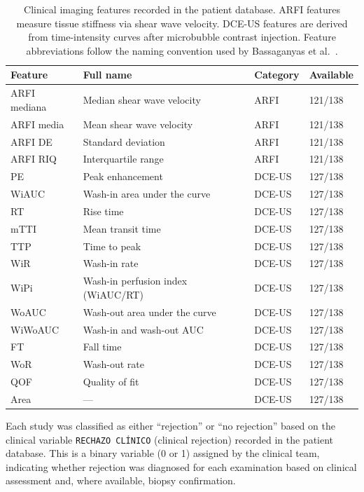 \begin{table}[ht]
\centering
\caption{Clinical imaging features recorded in the patient database. ARFI features measure tissue stiffness via shear wave velocity. DCE-US features are derived from time-intensity curves after microbubble contrast injection. Feature abbreviations follow the naming convention used by Bassaganyas et al.\ \cite{bassaganyas2025}.}
\label{tab:clinical_features}
\begin{tabular}{llll}
\toprule
Feature & Full name & Category & Available \\
\midrule
ARFI mediana & Median shear wave velocity & ARFI & 121/138 \\
ARFI media & Mean shear wave velocity & ARFI & 121/138 \\
ARFI DE & Standard deviation & ARFI & 121/138 \\
ARFI RIQ & Interquartile range & ARFI & 121/138 \\
\midrule
PE & Peak enhancement & DCE-US & 127/138 \\
WiAUC & Wash-in area under the curve & DCE-US & 127/138 \\
RT & Rise time & DCE-US & 127/138 \\
mTTI & Mean transit time & DCE-US & 127/138 \\
TTP & Time to peak & DCE-US & 127/138 \\
WiR & Wash-in rate & DCE-US & 127/138 \\
WiPi & Wash-in perfusion index (WiAUC/RT) & DCE-US & 127/138 \\
WoAUC & Wash-out area under the curve & DCE-US & 127/138 \\
WiWoAUC & Wash-in and wash-out AUC & DCE-US & 127/138 \\
FT & Fall time & DCE-US & 127/138 \\
WoR & Wash-out rate & DCE-US & 127/138 \\
QOF & Quality of fit & DCE-US & 127/138 \\
Area & --- & DCE-US & 127/138 \\
\bottomrule
\end{tabular}
\end{table}

Each study was classified as either ``rejection'' or ``no rejection'' based on the clinical variable \texttt{RECHAZO CL\'{I}NICO} (clinical rejection) recorded in the patient database. This is a binary variable (0 or 1) assigned by the clinical team, indicating whether rejection was diagnosed for each examination based on clinical assessment and, where available, biopsy confirmation.


